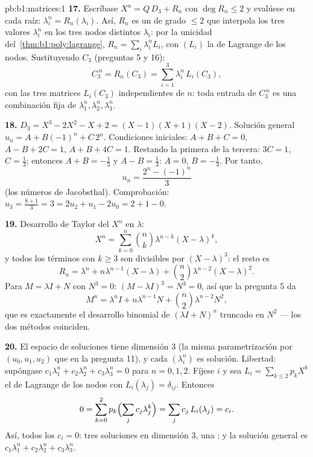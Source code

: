 \begin{solution}{pb:b1:matrices:1}
\textbf{17.} Escríbase $X^n = Q\,D_3 + R_n$ con $\deg R_n \leq 2$ y
evalúese en cada raíz: $\lambda_i^n = R_n(\lambda_i)$. Así, $R_n$ es
un  de grado $\leq 2$ que interpola los tres valores
$\lambda_i^n$ en los tres nodos distintos $\lambda_i$: por la
unicidad del~\cref{thm:b1:poly:lagrange},
$R_n = \sum_i \lambda_i^n L_i$, con $(L_i)$ la  de Lagrange de
los nodos. Sustituyendo $C_3$ (preguntas 5 y 16):
\[
C_3^{\,n} = R_n(C_3) = \sum_{i=1}^{3} \lambda_i^n\,L_i(C_3),
\]
con las tres matrices $L_i(C_3)$ independientes de $n$: toda entrada
de $C_3^{\,n}$ es una combinación fija de
$\lambda_1^n, \lambda_2^n, \lambda_3^n$.

\textbf{18.} $D_3 = X^3 - 2X^2 - X + 2 = (X-1)(X+1)(X-2)$. Solución
general $u_n = A + B(-1)^n + C\,2^n$. Condiciones iniciales:
$A + B + C = 0$, $A - B + 2C = 1$, $A + B + 4C = 1$. Restando la
primera de la tercera: $3C = 1$, $C = \frac13$; entonces
$A + B = -\frac13$ y $A - B = \frac13$: $A = 0$, $B = -\frac13$. Por
tanto,
\[
u_n = \frac{2^n - (-1)^n}{3}
\]
(los números de Jacobsthal). Comprobación:
$u_3 = \frac{8 + 1}{3} = 3 = 2u_2 + u_1 - 2u_0 = 2 + 1 - 0$.

\textbf{19.} Desarrollo de Taylor del  $X^n$ en
$\lambda$:
\[
X^n = \sum_{k=0}^{n} \binom nk \lambda^{n-k}(X - \lambda)^k ,
\]
y todos los términos con $k \geq 3$ son divisibles por
$(X - \lambda)^3$: el resto es
\[
R_n = \lambda^n + n\lambda^{n-1}(X - \lambda) + \binom
n2\lambda^{n-2}(X - \lambda)^2 .
\]
Para $M = \lambda I + N$ con $N^3 = 0$:
$(M - \lambda I)^3 = N^3 = 0$, así que la pregunta 5 da
\[
M^n = \lambda^n I + n\lambda^{n-1} N + \binom n2
\lambda^{n-2} N^2 ,
\]
que es exactamente el desarrollo binomial de $(\lambda I + N)^n$
truncado en $N^2$ --- los dos métodos coinciden.

\textbf{20.} El espacio de soluciones tiene dimensión $3$ (la misma
parametrización por $(u_0, u_1, u_2)$ que en la pregunta 11), y cada
$(\lambda_i^n)$ es solución. Libertad: supóngase
$c_1\lambda_1^n + c_2\lambda_2^n + c_3\lambda_3^n = 0$ para
$n = 0, 1, 2$. Fíjese $i$ y sea $L_i = \sum_{k \leq 2} p_k X^k$ el
 de Lagrange de los nodos con
$L_i(\lambda_j) = \delta_{ij}$. Entonces
\[
0 = \sum_{k=0}^{2} p_k\Bigl(\sum_j c_j\lambda_j^k\Bigr)
= \sum_j c_j\,L_i(\lambda_j) = c_i .
\]
Así, todos los $c_i = 0$: tres soluciones  en dimensión $3$,
una ; y la solución general es
$c_1\lambda_1^n + c_2\lambda_2^n + c_3\lambda_3^n$.


\end{solution}
